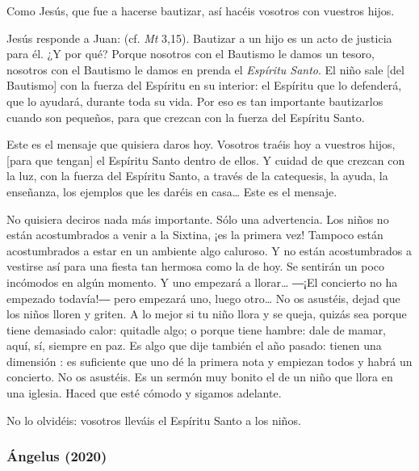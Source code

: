 			\begin{body}
				Como Jesús, que fue a hacerse bautizar, así hacéis vosotros con vuestros hijos.
				
				Jesús responde a Juan:  (cf. \emph{Mt} 3,15). Bautizar a un hijo es un acto de justicia para él. ¿Y por qué? Porque nosotros con el Bautismo le damos un tesoro, nosotros con el Bautismo le damos en prenda el \emph{Espíritu Santo}. El niño sale {[}del Bautismo{]} con la fuerza del Espíritu en su interior: el Espíritu que lo defenderá, que lo ayudará, durante toda su vida. Por eso es tan importante bautizarlos cuando son pequeños, para que crezcan con la fuerza del Espíritu Santo.
				
				Este es el mensaje que quisiera daros hoy. Vosotros traéis hoy a vuestros hijos, {[}para que tengan{]} el Espíritu Santo dentro de ellos. Y cuidad de que crezcan con la luz, con la fuerza del Espíritu Santo, a través de la catequesis, la ayuda, la enseñanza, los ejemplos que les daréis en casa\ldots{} Este es el mensaje.
				
				No quisiera deciros nada más importante. Sólo una advertencia. Los niños no están acostumbrados a venir a la Sixtina, ¡es la primera vez! Tampoco están acostumbrados a estar en un ambiente algo caluroso. Y no están acostumbrados a vestirse así para una fiesta tan hermosa como la de hoy. Se sentirán un poco incómodos en algún momento. Y uno empezará a llorar\ldots{} ―¡El concierto no ha empezado todavía!― pero empezará uno, luego otro\ldots{} No os asustéis, dejad que los niños lloren y griten. A lo mejor si tu niño llora y se queja, quizás sea porque tiene demasiado calor: quitadle algo; o porque tiene hambre: dale de mamar, aquí, sí, siempre en paz. Es algo que dije también el año pasado: tienen una dimensión : es suficiente que uno dé la primera nota y empiezan todos y habrá un concierto. No os asustéis. Es un sermón muy bonito el de un niño que llora en una iglesia. Haced que esté cómodo y sigamos adelante.
				
				No lo olvidéis: vosotros lleváis el Espíritu Santo a los niños.
			\end{body}
		
		\subsubsection{Ángelus (2020)} 
		
			
